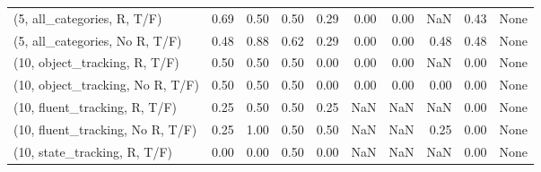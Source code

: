 \begin{table*}[h!]
\begin{adjustbox}{width=2\columnwidth,center}
\begin{tabular}{lrrr|rrr|rrr}
(5, all\_categories, R, T/F)          &                      0.69 &                  0.50 &                      0.50 &                          0.29 &                      0.00 &                          0.00 &                                    NaN &                               0.43 &                                  None \\
(5, all\_categories, No R, T/F)       &                      0.48 &                  0.88 &                      0.62 &                          0.29 &                      0.00 &                          0.00 &                                   0.48 &                               0.48 &                                  None \\



\midrule
(10, object\_tracking, R, T/F)         &                      0.50 &                  0.50 &                      0.50 &                          0.00 &                      0.00 &                          0.00 &                                    NaN &                               0.00 &                                  None \\
(10, object\_tracking, No R, T/F)      &                      0.50 &                  0.50 &                      0.50 &                          0.00 &                      0.00 &                          0.00 &                                   0.00 &                               0.00 &                                  None \\
(10, fluent\_tracking, R, T/F)         &                      0.25 &                  0.50 &                      0.50 &                          0.25 &                       NaN &                           NaN &                                    NaN &                               0.00 &                                  None \\
(10, fluent\_tracking, No R, T/F)      &                      0.25 &                  1.00 &                      0.50 &                          0.50 &                       NaN &                           NaN &                                   0.25 &                               0.00 &                                  None \\
(10, state\_tracking, R, T/F)          &                      0.00 &                  0.00 &                      0.50 &                          0.00 &                       NaN &                           NaN &                                    NaN &                               0.00 &                                  None \\

\end{tabular}
\end{adjustbox}
\end{table*}
